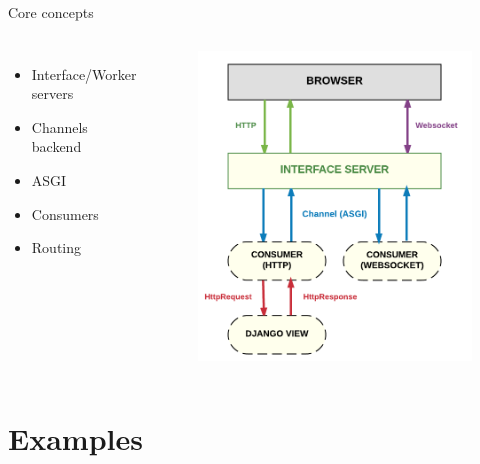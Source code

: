\documentclass{beamer}
\begin{document}
\begin{frame}{Core concepts}
	\begin{adjustwidth}{2em}{2.5em}
		\begin{columns}
			\begin{itemize}
				\item Interface/Worker servers
				\item Channels backend
				\item ASGI
				\item Consumers
				\item Routing
			\end{itemize}
			
			\pause
			\begin{figure}
				\includegraphics[scale=0.58]{channels_diagram.png}
			\end{figure}
		\end{columns}
	\end{adjustwidth}
\end{frame}

\section{Examples}
\end{document}
